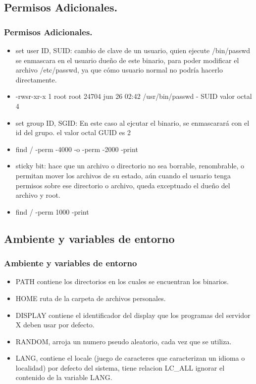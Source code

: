 \documentclass{beamer}
\begin{document}
\subsection{Permisos Adicionales.}
\begin{frame}
\frametitle{Permisos Adicionales.}
\begin{itemize}
	\item \alert{set user ID,  SUID:} cambio de clave de un usuario, quien ejecute /bin/passwd se enmascara en el usuario due\~no de este binario, para poder modificar el archivo /etc/passwd, ya que cómo usuario normal no podría hacerlo directamente.
	\item -rwsr-xr-x 1 root root 24704 jun 26 02:42 /usr/bin/passwd - SUID valor octal 4
	\item \alert{set group ID,  SGID:}  En este caso al ejcutar el binario, se enmascarar\'a con el id del grupo. el valor octal GUID es 2
	\item find / -perm -4000 -o -perm -2000 -print 
	\item \alert{sticky bit:} hace que un archivo o directorio no sea borrable, renombrable, o permitan mover los archivos de su estado, aún cuando el usuario tenga permisos sobre ese directorio o archivo, queda exceptuado el dueño del archivo y root.
	\item find / -perm 1000 -print
\end{itemize}
\end{frame}

\subsection{Ambiente y variables de entorno}
\begin{frame}
\frametitle{Ambiente y variables de entorno}
        \begin{itemize}
                \item PATH contiene los directorios en los cuales se encuentran los binarios.
                \item HOME ruta de la carpeta de archivos personales.
                \item DISPLAY contiene el identificador del display que los programas del servidor X deben usar por defecto.
                \item RANDOM, arroja un numero pseudo aleatorio, cada vez que se utiliza.
                \item LANG, contiene el locale (juego de caracteres que caracterizan un idioma o localidad) por defecto del sistema, tiene relacion LC\_ALL  ignorar el contenido de la variable LANG.
        \end{itemize}
\end{frame}
\end{document}
